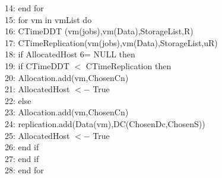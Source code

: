 \documentclass[12pt,a4paper]{report}
\begin{document}
14: end for \\
15: for vm in vmList do \\
16:\hspace{0.1 in} CTimeDDT (vm(jobs),vm(Data),StorageList,R) \\
17:\hspace{0.1 in} CTimeReplication(vm(jobs),vm(Data),StorageList,uR) \\
18:\hspace{0.1 in} if AllocatedHost 6= NULL then \\
19:\hspace{0.2 in} if CTimeDDT $<$ CTimeReplication then \\
20: \hspace{0.3 in}Allocation.add(vm,ChosenCn) \\
21: \hspace{0.3 in}AllocatedHost $<-$ True \\
22: \hspace{0.2 in}else\\
 23:\hspace{0.3 in} Allocation.add(vm,ChosenCn) \\
24: \hspace{0.3 in}replication.add(Data(vm),DC(ChosenDc,ChosenS)) \\
25:\hspace{0.3 in} AllocatedHost $<-$ True\\
 26: \hspace{0.2 in}end if \\
27: \hspace{0.1 in}end if \\
28: end for\\

\newpage
\end{document}
